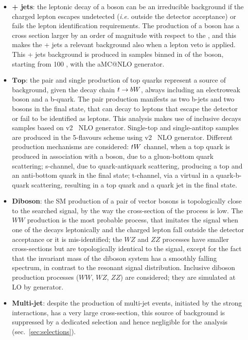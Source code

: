 \begin{itemize}
  \item {\bf \W + jets}: the leptonic decay of a \W boson can be an irreducible background if the charged lepton escapes undetected (\textit{i.e.} outside the detector acceptance) or fails the lepton identification requirements. The production of a \W boson has a cross section larger by an order of magnitude with respect to the \Z, and this makes the \W + jets a relevant background also when a lepton veto is applied. This \W + jets background is produced in samples binned in \pt of the \W boson, starting from 100 \GeV, with the {\sc aMC@NLO} generator.%
  \item $\mathbf{Top}$: the pair and single production of top quarks represent a source of background, given the decay chain $t \rightarrow b W$, always including an electroweak \W boson and a b-quark. The \ttbar pair production manifests as two b-jets and two \W bosons in the final state, that can decay to leptons that escape the detector or fail to be identified as leptons. This analysis makes use of \ttbar inclusive decays samples based on \POWHEG v2~\cite{bib:POWHEGst} NLO generator. Single-top and single-antitop samples are produced in the 5-flavours scheme using \POWHEG v2~\cite{bib:POWHEGtt} NLO generator. Different production mechanisms are considered: $t W$ channel, when a top quark is produced in association with a \W boson, due to a gluon-bottom quark scattering; s-channel, due to quark-antiquark scattering, producing a top and an anti-bottom quark in the final state; t-channel, via a virtual \W in a quark-b-quark scattering, resulting in a top quark and a quark jet in the final state.
  \item {\bf Diboson}: the SM production of a pair of vector bosons is topologically close to the searched signal, by the way the cross-section of the process is low. The $WW$ production is the most probable process, that imitates the signal when one of the \W decays leptonically and the charged lepton fall outside the detector acceptance or it is mis-identified; the $WZ$ and $ZZ$ processes have smaller cross-sections but are topologically identical to the signal, except for the fact that the invariant mass of the diboson system has a smoothly falling spectrum, in contrast to the resonant signal distribution. Inclusive diboson production processes ($WW$, $WZ$, $ZZ$) are considered; they are simulated at LO by \PYTHIA generator.
  \item {\bf Multi-jet}: despite the production of multi-jet events, initiated by the strong interactions, has a very large cross-section, this source of background is suppressed by a dedicated selection and hence negligible for the analysis (sec.~\ref{sec:selections}).
\end{itemize}




